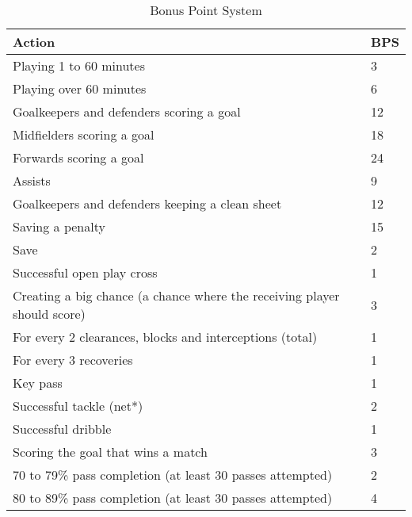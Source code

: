\begin{table}[H]
\centering
\caption{Bonus Point System}
\begin{tabular}{|l|l|}
\hline
\textbf{Action}                                                                   & \textbf{BPS} \\
\hline
Playing 1 to 60 minutes                                                  & 3   \\
Playing over 60 minutes                                                  & 6   \\
Goalkeepers and defenders scoring a goal                                 & 12  \\
Midfielders scoring a goal                                               & 18  \\
Forwards scoring a goal                                                  & 24  \\
Assists                                                                  & 9   \\
Goalkeepers and defenders keeping a clean sheet                          & 12  \\
Saving a penalty                                                         & 15  \\
Save                                                                     & 2   \\
Successful open play cross                                               & 1   \\
Creating a big chance (a chance where the receiving player should score) & 3   \\
For every 2 clearances, blocks and interceptions (total)                 & 1   \\
For every 3 recoveries                                                   & 1   \\
Key pass                                                                 & 1   \\
Successful tackle (net*)                                                 & 2   \\
Successful dribble                                                       & 1   \\
Scoring the goal that wins a match                                       & 3   \\
70 to 79\% pass completion (at least 30 passes attempted)                & 2   \\
80 to 89\% pass completion (at least 30 passes attempted)                & 4   \\

\end{tabular}
\end{table}

